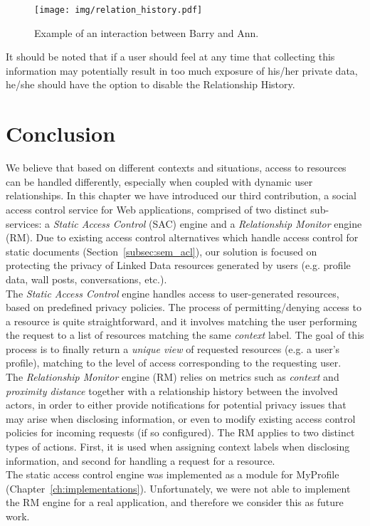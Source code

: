 \begin{figure}[h]
  \begin{center}
    \texttt{[image: img/relation\_history.pdf]}
        \caption{Example of an interaction between Barry and Ann.}
        \label{fig:relation_history}
  \end{center}
\end{figure}

It should be noted that if a user should feel at any time that collecting this information may potentially result in too much exposure of his/her private data, he/she should have the option to disable the Relationship History.

\section{Conclusion}
We believe that based on different contexts and situations, access to resources can be handled differently, especially when coupled with dynamic user relationships. In this chapter we have introduced our third contribution, a social access control service for Web applications, comprised of two distinct sub-services: a \textit{Static Access Control} (SAC) engine and a \textit{Relationship Monitor} engine (RM). Due to existing access control alternatives which handle access control for static documents (Section~\ref{subsec:sem_acl}), our solution is focused on protecting the privacy of Linked Data resources generated by users (e.g. profile data, wall posts, conversations, etc.).\\

The \textit{Static Access Control} engine handles access to user-generated resources, based on predefined privacy policies. The process of permitting/denying access to a resource is quite straightforward, and it involves matching the user performing the request to a list of resources matching the same \textit{context} label. The goal of this process is to finally return a \textit{unique view} of requested resources (e.g. a user's profile), matching to the level of access corresponding to the requesting user.\\

The \textit{Relationship Monitor} engine (RM) relies on metrics such as \textit{context} and \textit{proximity distance} together with a relationship history between the involved actors, in order to either provide notifications for potential privacy issues that may arise when disclosing information, or even to modify existing access control policies for incoming requests (if so configured). The RM applies to two distinct types of actions. First, it is used when assigning context labels when disclosing information, and second for handling a request for a resource.\\

The static access control engine was implemented as a module for MyProfile (Chapter~\ref{ch:implementations}). Unfortunately, we were not able to implement the RM engine for a real application, and therefore we consider this as future work.
